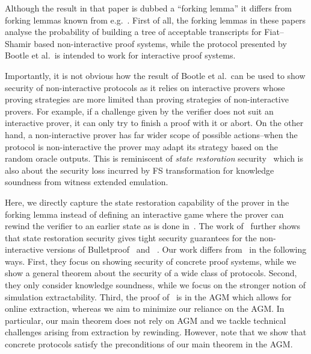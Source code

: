 Although the result in that paper is dubbed a ``forking lemma'' it
differs from forking lemmas known from e.g.~\cite{JC:PoiSte00,CCS:BelNev06}.
First of all, the forking lemmas in these papers analyse the probability of building
a tree of acceptable transcripts for Fiat--Shamir based non-interactive proof
systems, while the protocol presented by Bootle et al.~is intended to work for
interactive proof systems.

Importantly, it is not obvious how the result of Bootle et al.~can be used to
show security of non-interactive protocols as it relies on interactive provers
whose proving strategies are more limited than proving strategies of
non-interactive provers. For example, if a challenge given by the verifier does not
suit an interactive prover, it can only try to finish a proof with it or
abort. On the other hand, a non-interactive prover has far wider scope of
possible actions--when the protocol is non-interactive the prover may
adapt its strategy based on the random oracle outputs. 
This is reminiscent of \emph{state restoration} security~\cite{TCC:BenChiSpo16,EPRINT:Holmgren19} which is also about the security loss incurred by FS transformation for knowledge soundness from witness extended emulation.

Here, we directly capture the state restoration capability of the prover in the forking lemma instead of defining an interactive game where the prover can rewind the verifier to an earlier state as is done in~\cite{C:GhoTes21}. 
The work of~\cite{C:GhoTes21} further shows that state restoration security gives tight security guarantees for the
non-interactive versions of Bulletproof~\cite{SP:BBBPWM18} and \sonic~. 
Our work differs from~\cite{C:GhoTes21} in the following ways. First, they
focus on showing security of concrete proof systems, while we show
a general theorem about the security of a wide class of protocols. 
Second, they only consider knowledge soundness, while we focus on the stronger notion of simulation extractability. Third, the proof of~\cite{C:GhoTes21} is in the AGM which allows for online extraction, whereas we aim to minimize our reliance on the AGM. In particular, our main theorem does not rely on AGM and we tackle technical challenges arising from extraction by rewinding. 
However, note that we show that concrete protocols satisfy the preconditions of our main theorem in the AGM.

